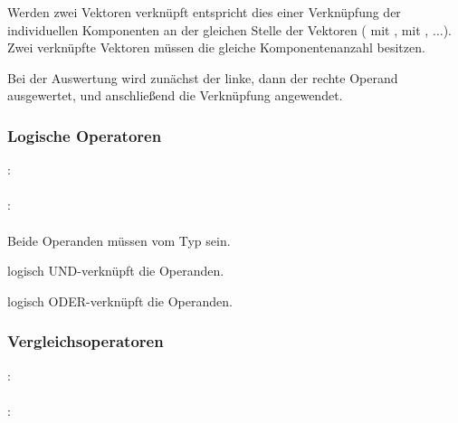 Werden zwei Vektoren verknüpft entspricht dies einer Verknüpfung der individuellen Komponenten an der gleichen
Stelle der Vektoren ( mit ,  mit , $\dots$). Zwei verknüpfte Vektoren müssen
die gleiche Komponentenanzahl besitzen.

Bei der Auswertung wird zunächst der linke, dann der rechte Operand ausgewertet, und an\-schließend die Verknüpfung angewendet.

\subsubsection{Logische Operatoren}\label{Logische Operatoren}
:\label{asdr_logisch_oder}\\
\hspace*{1cm} \Gspace{}\\
:\label{asdr_logisch_und}\\
\hspace*{1cm} \Gspace{}\\


Beide Operanden müssen vom Typ  sein.

\op{\&\&} logisch UND-verknüpft die Operanden.

\op{||} logisch ODER-verknüpft die Operanden.


\subsubsection{Vergleichsoperatoren}\label{Vergleichsoperatoren}
:\label{asdr_gleichheit}\\
\hspace*{1cm} \Gspace{}\\
:\label{asdr_vergleich}\\
\hspace*{1cm} \Gspace{}\\

